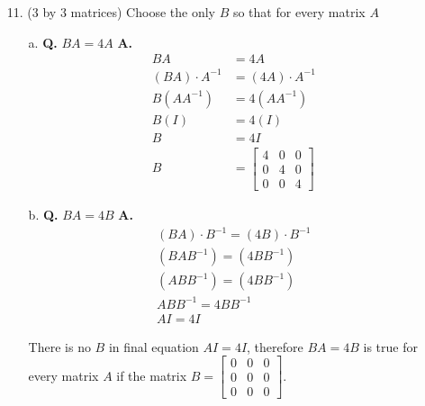 \documentclass[main.tex]{subfiles}
\begin{document}
\begin{enumerate}
    \item [11.] (3 by 3 matrices) Choose the only $B$ so that for every matrix $A$
    \begin{enumerate}
        \item [a.] \textbf{Q.} $BA=4A$ \textbf{A.} 
        $$
        \begin{aligned}
        B A &=4 A \\
        (B A) \cdot A^{-1} &= (4 A) \cdot A^{-1} \\
        B\left(A A^{-1}\right) &= 4\left(A A^{-1}\right) \\
        B(I) &=4(I) \\
        B & =4 I \\
        B & =\left[\begin{array}{lll}
        4 & 0 & 0 \\
        0 & 4 & 0 \\
        0 & 0 & 4
        \end{array}\right]
        \end{aligned}
        $$
        
        \item [b.] \textbf{Q.} $B A=4 B$ \textbf{A.}
        $$
        \begin{gathered}
        (B A) \cdot B^{-1}=(4 B) \cdot B^{-1} \\
        \left(B A B^{-1}\right)=\left(4 B B^{-1}\right) \\
        \left(A B B^{-1}\right)=\left(4 B B^{-1}\right) \\
        A B B^{-1}=4 B B^{-1} \\
        A I=4 I
        \end{gathered}
        $$
        
        There is no $B$ in final equation $AI = 4I$, therefore $B A=4 B$ is true for every matrix $A$ if the matrix $B=\left[\begin{array}{lll}0 & 0 & 0 \\ 0 & 0 & 0 \\ 0 & 0 & 0\end{array}\right]$.
        

\end{enumerate}
\end{enumerate}
\end{document}

